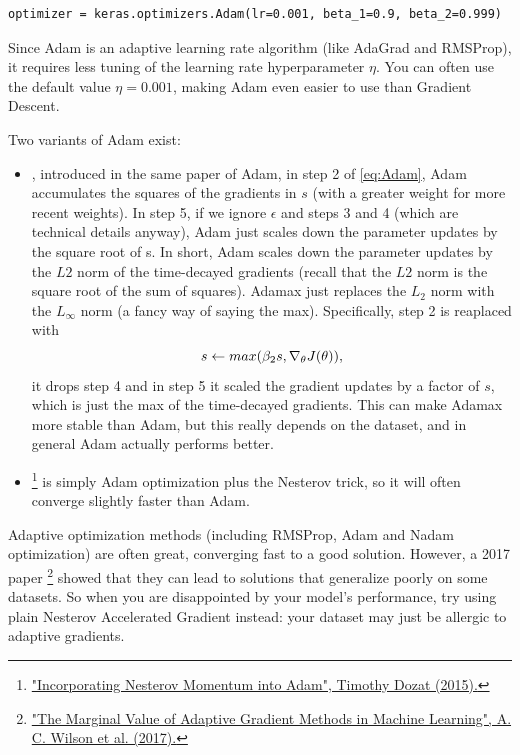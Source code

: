 \begin{lstlisting}
optimizer = keras.optimizers.Adam(lr=0.001, beta_1=0.9, beta_2=0.999)
\end{lstlisting}
Since Adam is an adaptive learning rate algorithm (like AdaGrad and RMSProp), it requires less tuning of the learning rate hyperparameter $\eta$. You can often use the default value $\eta = 0.001$, making Adam even easier to use than Gradient Descent.

Two variants of Adam exist:
\begin{itemize}
\item {}, introduced in the same paper of Adam, in step 2 of \autoref{eq:Adam}, Adam accumulates the squares of the gradients in $s$ (with a greater weight for more recent weights). In step 5, if we ignore $\epsilon$ and steps 3 and 4 (which are technical details anyway), Adam just scales down the parameter updates by the square root of s. In short, Adam scales down the parameter updates by the $L2$ norm of the time-decayed gradients (recall that the $L2$ norm is the square root of the sum of squares). Adamax just replaces the $L_2$ norm with the $L_\infty$ norm (a fancy way of saying the max). Specifically, step 2 is reaplaced with
\begin{equation}
s \leftarrow max\br{\beta_2 s, \nabla_\theta J(\theta)},
\end{equation}
it drops step 4 and in step 5 it scaled the gradient updates by a factor of $s$, which is just the max of the time-decayed gradients. This can make Adamax more stable than Adam, but this really depends on the dataset, and in general Adam actually performs better.
\item {}\footnote{\href{https://homl.info/nadam}{"Incorporating Nesterov Momentum into Adam", Timothy Dozat (2015).}} is simply Adam optimization plus the Nesterov trick, so it will often converge slightly faster than Adam. 
\end{itemize}

Adaptive optimization methods (including RMSProp, Adam and Nadam optimization) are often great, converging fast to a good solution. However, a 2017 paper \footnote{\href{https://homl.info/60}{"The Marginal Value of Adaptive Gradient Methods in Machine Learning", A. C. Wilson et al. (2017).}} showed that they can lead to solutions that generalize poorly on some datasets. So when you are disappointed by your model's performance, try using plain Nesterov Accelerated Gradient instead: your dataset may just be allergic to adaptive gradients.

